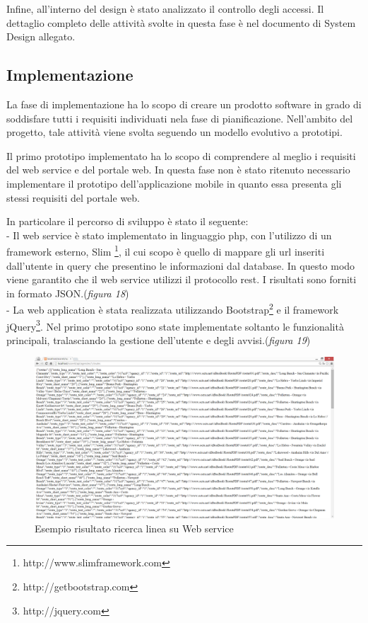 Infine, all\rq interno del design \`{e} stato analizzato il controllo degli accessi. 
Il dettaglio completo delle attivit\`{a} svolte in questa fase \`{e} nel documento di System Design allegato.

\subsection{Implementazione}
La fase di implementazione ha lo scopo di creare un prodotto software in grado di soddisfare tutti i requisiti individuati nela fase di pianificazione. Nell'ambito del progetto, tale attivit\`{a} viene svolta seguendo un modello evolutivo a prototipi. 

Il primo prototipo implementato ha lo scopo di comprendere al meglio i requisiti del web service e del portale web. In questa fase non \`{e} stato ritenuto necessario implementare il prototipo dell\rq applicazione mobile in quanto essa presenta gli stessi requisiti del portale web. 

In particolare il percorso di sviluppo \`{e} stato il seguente:\\
- Il web service \`{e} stato implementato in linguaggio php, con l\rq utilizzo di un framework esterno, Slim \footnote{http://www.slimframework.com}, il cui scopo \`{e} quello di mappare gli url inseriti dall\rq utente in query che presentino le informazioni dal database. In questo modo viene garantito che il web service utilizzi il protocollo rest. I risultati sono forniti in formato JSON.(\emph{figura 18}) \\
- La web application \`{e} stata realizzata utilizzando Bootstrap\footnote{http://getbootstrap.com} e il framework jQuery\footnote{http://jquery.com}. Nel primo prototipo sono state implementate soltanto le funzionalit\`{a} principali, tralasciando la gestione dell\rq utente e degli avvisi.(\emph{figura 19}) \\

\begin{figure}[tb]
\centering
\includegraphics[scale=.3]{img/19.png}
\caption{Esempio risultato ricerca linea su Web service }
\label{fig:mhs}
\end{figure} 

